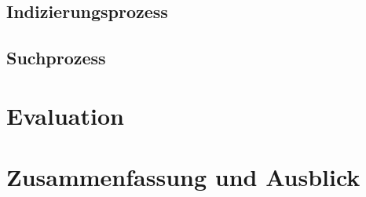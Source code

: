\documentclass[11pt,a4paper, halfparskip]{scrartcl}
\begin{document}
\subsection{Indizierungsprozess}



\subsection{Suchprozess}

\newpage
\section{Evaluation}

\newpage
\section{Zusammenfassung und Ausblick}

\end{document}
